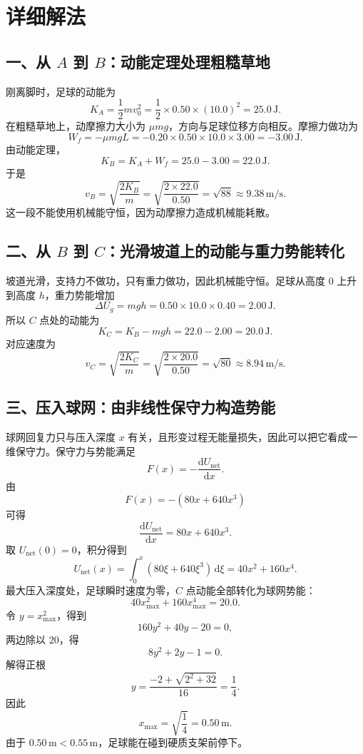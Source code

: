 \documentclass[11pt,a4paper,fontset=fandol]{ctexart}
\newcommand{\dd}{\mathrm{d}}
\begin{document}
\section*{详细解法}

\subsection*{一、从 $A$ 到 $B$：动能定理处理粗糙草地}
刚离脚时，足球的动能为
\[
 K_A=\frac12mv_0^2=\frac12\times 0.50\times (10.0)^2=25.0\,\mathrm{J}.
\]
在粗糙草地上，动摩擦力大小为 $\mu mg$，方向与足球位移方向相反。摩擦力做功为
\[
 W_f=-\mu mgL=-0.20\times 0.50\times 10.0\times 3.00=-3.00\,\mathrm{J}.
\]
由动能定理，
\[
 K_B=K_A+W_f=25.0-3.00=22.0\,\mathrm{J}.
\]
于是
\[
 v_B=\sqrt{\frac{2K_B}{m}}=\sqrt{\frac{2\times 22.0}{0.50}}
=\sqrt{88}\approx 9.38\,\mathrm{m/s}.
\]
这一段不能使用机械能守恒，因为动摩擦力造成机械能耗散。

\subsection*{二、从 $B$ 到 $C$：光滑坡道上的动能与重力势能转化}
坡道光滑，支持力不做功，只有重力做功，因此机械能守恒。足球从高度 $0$ 上升到高度 $h$，重力势能增加
\[
 \Delta U_g=mgh=0.50\times 10.0\times 0.40=2.00\,\mathrm{J}.
\]
所以 $C$ 点处的动能为
\[
 K_C=K_B-mgh=22.0-2.00=20.0\,\mathrm{J}.
\]
对应速度为
\[
 v_C=\sqrt{\frac{2K_C}{m}}=\sqrt{\frac{2\times 20.0}{0.50}}
=\sqrt{80}\approx 8.94\,\mathrm{m/s}.
\]

\subsection*{三、压入球网：由非线性保守力构造势能}
球网回复力只与压入深度 $x$ 有关，且形变过程无能量损失，因此可以把它看成一维保守力。保守力与势能满足
\[
 F(x)=-\frac{\dd U_{\mathrm{net}}}{\dd x}.
\]
由
\[
 F(x)=-(80x+640x^3)
\]
可得
\[
 \frac{\dd U_{\mathrm{net}}}{\dd x}=80x+640x^3.
\]
取 $U_{\mathrm{net}}(0)=0$，积分得到
\[
 U_{\mathrm{net}}(x)=\int_0^x (80\xi+640\xi^3)\,\dd\xi
=40x^2+160x^4.
\]
最大压入深度处，足球瞬时速度为零，$C$ 点动能全部转化为球网势能：
\[
 40x_{\max}^2+160x_{\max}^4=20.0.
\]
令 $y=x_{\max}^2$，得到
\[
 160y^2+40y-20=0,
\]
两边除以 $20$，得
\[
 8y^2+2y-1=0.
\]
解得正根
\[
 y=\frac{-2+\sqrt{2^2+32}}{16}=\frac{1}{4}.
\]
因此
\[
 x_{\max}=\sqrt{\frac14}=0.50\,\mathrm{m}.
\]
由于 $0.50\,\mathrm{m}<0.55\,\mathrm{m}$，足球能在碰到硬质支架前停下。
\end{document}
